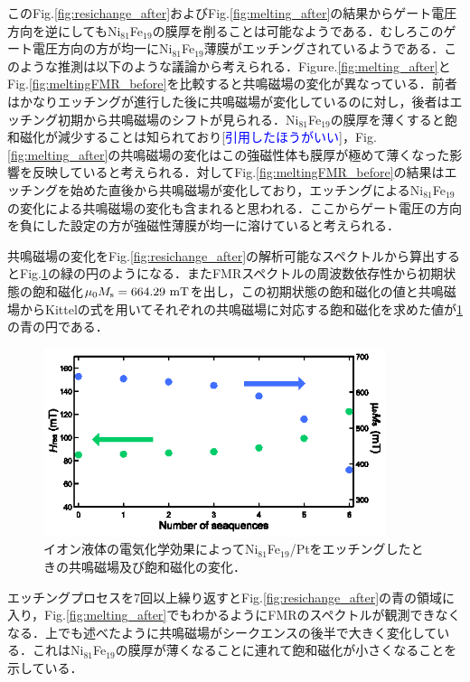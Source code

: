 このFig.\ref{fig:resichange_after}およびFig.\ref{fig:melting_after}の結果からゲート電圧方向を逆にしてもNi$_{81}$Fe$_{19}$の膜厚を削ることは可能なようである．むしろこのゲート電圧方向の方が均一にNi$_{81}$Fe$_{19}$薄膜がエッチングされているようである．このような推測は以下のような議論から考えられる．Figure.\ref{fig:melting_after}とFig.\ref{fig:meltingFMR_before}を比較すると共鳴磁場の変化が異なっている．前者はかなりエッチングが進行した後に共鳴磁場が変化しているのに対し，後者はエッチング初期から共鳴磁場のシフトが見られる．Ni$_{81}$Fe$_{19}$の膜厚を薄くすると飽和磁化が減少することは知られており[\textcolor{blue}{引用したほうがいい}]，Fig.\ref{fig:melting_after}の共鳴磁場の変化はこの強磁性体も膜厚が極めて薄くなった影響を反映していると考えられる．対してFig.\ref{fig:meltingFMR_before}の結果はエッチングを始めた直後から共鳴磁場が変化しており，エッチングによるNi$_{81}$Fe$_{19}$の変化による共鳴磁場の変化も含まれると思われる．ここからゲート電圧の方向を負にした設定の方が強磁性薄膜が均一に溶けていると考えられる．

共鳴磁場の変化をFig.\ref{fig:resichange_after}の解析可能なスペクトルから算出するとFig.\ref{fig:Hreschange_after}の緑の円のようになる．またFMRスペクトルの周波数依存性から初期状態の飽和磁化$\mu_{0}M_{\rm s} = 664.29\rm\ mT$を出し，この初期状態の飽和磁化の値と共鳴磁場からKittelの式を用いてそれぞれの共鳴磁場に対応する飽和磁化を求めた値が\ref{fig:Hreschange_after}の青の円である．

\begin{figure}[htbp]
\centerline{
\includegraphics[width=10cm]{images/Hreschange_after.eps}
}
\caption{イオン液体の電気化学効果によってNi$_{81}$Fe$_{19}$/Ptをエッチングしたときの共鳴磁場及び飽和磁化の変化．
}
\label{fig:Hreschange_after}
\end{figure}

エッチングプロセスを7回以上繰り返すとFig.\ref{fig:resichange_after}の青の領域に入り，Fig.\ref{fig:melting_after}でもわかるようにFMRのスペクトルが観測できなくなる．上でも述べたように共鳴磁場がシークエンスの後半で大きく変化している．これはNi$_{81}$Fe$_{19}$の膜厚が薄くなることに連れて飽和磁化が小さくなることを示している．



